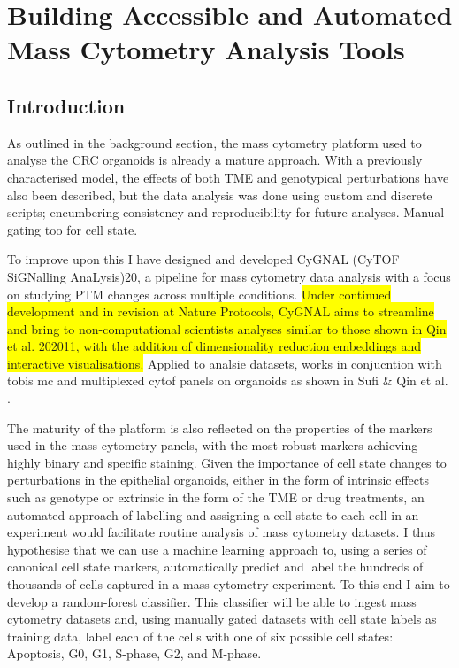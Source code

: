 \chapter{Building Accessible and Automated Mass Cytometry Analysis Tools}
\label{03cygnal}

\section{Introduction}


As outlined in the background section, the mass cytometry platform used to analyse the CRC organoids is already a mature approach. With a previously characterised model, the effects of both TME and genotypical perturbations have also been described, but the data analysis was done using custom and discrete scripts; encumbering consistency and reproducibility for future analyses. Manual gating too for cell state.

To improve upon this I have designed and developed CyGNAL (CyTOF SiGNalling AnaLysis)20, a pipeline for mass cytometry data analysis with a focus on studying PTM changes across multiple conditions. 
\colorbox{yellow}{Under continued development and in revision at Nature Protocols, CyGNAL aims to streamline and bring to non-computational scientists analyses similar to those shown in Qin et al. 202011, with the addition of dimensionality reduction embeddings and interactive visualisations.}
Applied to analsie datasets, works in conjucntion with tobis mc and multiplexed cytof panels on organoids as shown in Sufi \& Qin et al. \cite{sufi_multiplexed_2021}.

The maturity of the platform is also reflected on the properties of the markers used in the mass cytometry panels, with the most robust markers achieving highly binary and specific staining. Given the importance of cell state changes to perturbations in the epithelial organoids, either in the form of intrinsic effects such as genotype or extrinsic in the form of the TME or drug treatments, an automated approach of labelling and assigning a cell state to each cell in an experiment would facilitate routine analysis of mass cytometry datasets. 
I thus hypothesise that we can use a machine learning approach to, using a series of canonical cell state markers, automatically predict and label the hundreds of thousands of cells captured in a mass cytometry experiment. To this end I aim to develop a random-forest classifier. This classifier will be able to ingest mass cytometry datasets and, using manually gated datasets with cell state labels as training data, label each of the cells with one of six possible cell states: Apoptosis, G0, G1, S-phase, G2, and M-phase. 

